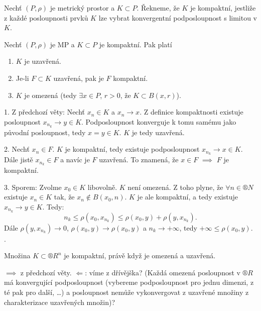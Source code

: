 \documentclass[12pt]{article}					%
\begin{document}
	\begin{definice}
		Nechť $(P, \rho)$ je metrický prostor a $K \subset P$. Řekneme, že $K$ je kompaktní, jestliže z každé posloupnosti prvků $K$ lze vybrat konvergentní podposloupnost s limitou v $K$.
	\end{definice}

	\begin{veta}
		Nechť $(P, \rho)$ je MP a $K \subset P$ je kompaktní. Pak platí

		\begin{enumerate}
			\item $K$ je uzavřená.
			\item Je-li $F \subset K$ uzavřená, pak je $F$ kompaktní.
			\item $K$ je omezená (tedy $\exists x \in P$, $r > 0$, že $K \subset B(x, r)$).
		\end{enumerate}

		\begin{dukazin}
			1. Z předchozí věty: Nechť $x_n \in K$ a $x_n \rightarrow x$. Z definice kompaktnosti existuje posloupnost $x_{n_k} \rightarrow y \in K$. Podposloupnost konverguje k tomu samému jako původní posloupnost, tedy $x = y \in K$. $K$ je tedy uzavřená.

			2. Nechť $x_n \in F$. $K$ je kompaktní, tedy existuje podposloupnost $x_{n_k} \rightarrow x \in K$. Dále jistě $x_{n_k} \in F$ a navíc je $F$ uzavřená. To znamená, že $x \in F$ $\implies$ $F$ je kompaktní.

			3. Sporem: Zvolme $x_0 \in K$ libovolně. $K$ není omezená. Z toho plyne, že $\forall n \in ®N$ existuje $x_n \in K$ tak, že $x_n \notin B(x_0, n)$. $K$ je ale kompaktní, a tedy existuje $x_{n_k} \rightarrow y \in K$. Tedy:
			$$ n_k ≤ \rho(x_0, x_{n_k}) ≤ \rho(x_0, y) + \rho(y, x_{n_k}). $$
			Dále $\rho(y, x_{n_k}) \rightarrow 0$, $\rho(x_0, y) \rightarrow \rho(x_0, y)$ a $n_k \rightarrow +∞$, tedy $+∞ ≤ \rho(x_0, y)$. \lightning.
		\end{dukazin}
	\end{veta}

	\begin{veta}
		Množina $K \subset ®R^n$ je kompaktní, právě když je omezená a uzavřená.

		\begin{dukazin}
			$\implies$ z předchozí věty. $\Leftarrow$: víme z dřívějška? (Každá omezená posloupnost v $®R$ má konvergující podposloupnost (vybereme podposloupnost pro jednu dimenzi, z té pak pro další, …) a posloupnost nemůže vykonvergovat z uzavřené množiny z charakterizace uzavřených množin)?
		\end{dukazin}
	\end{veta}
\end{document}

